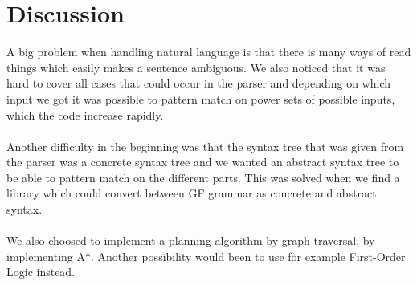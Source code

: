\section{Discussion}
A big problem when handling natural language is that there is many ways of read things which easily makes a sentence ambiguous. We also noticed that it was hard to cover all cases that could occur in the parser and depending on which input we got it was possible to pattern match on power sets of possible inputs, which the code increase rapidly. \\\\
Another difficulty in the beginning was that the syntax tree that was given from the parser was a concrete syntax tree and we wanted an abstract syntax tree to be able to pattern match on the different parts. This was solved when we find a library which could convert between GF grammar as concrete and abstract syntax. \\\\
We also choosed to implement a planning algorithm by graph traversal, by implementing A*. Another possibility would been to use for example First-Order Logic instead. 

